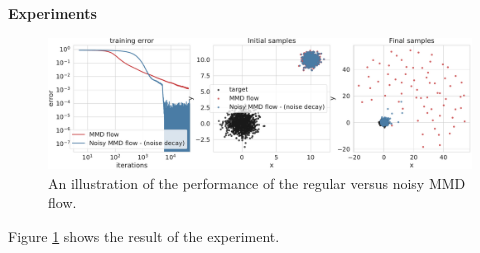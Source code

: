 











%
%
%
% 
%
%
%
\textbf{Experiments}


\begin{figure}[ht]
	\centering
	\includegraphics[width=1.\linewidth]{figures/Gaussians_error_4}
	\caption{An illustration of the performance of the regular versus noisy MMD flow.}
	\label{fig:experiments}
\end{figure}

Figure \ref{fig:experiments} shows the result of the experiment.









